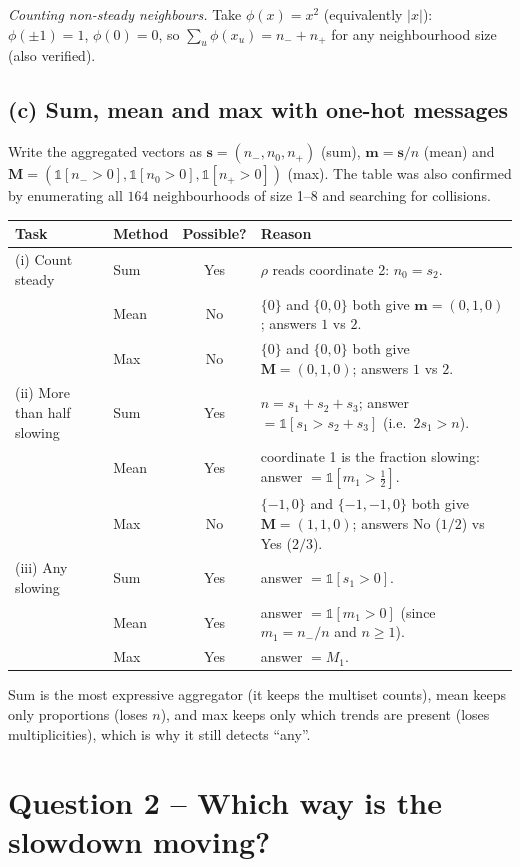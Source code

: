 \emph{Counting non-steady neighbours.} Take $\phi(x)=x^2$ (equivalently $|x|$): $\phi(\pm1)=1$, $\phi(0)=0$,
so $\sum_u\phi(x_u)=n_-+n_+$ for any neighbourhood size (also verified).

\subsection*{(c) Sum, mean and max with one-hot messages}
Write the aggregated vectors as $\mathbf s=(n_-,n_0,n_+)$ (sum), $\mathbf m=\mathbf s/n$ (mean) and
$\mathbf M=(\mathbb 1[n_->0],\mathbb 1[n_0>0],\mathbb 1[n_+>0])$ (max). The table was also confirmed by
enumerating all $164$ neighbourhoods of size 1--8 and searching for collisions.

\begin{center}
\small
\begin{tabular}{p{3.0cm}lcp{8.6cm}}
\toprule
Task & Method & Possible? & Reason \\
\midrule
(i) Count steady & Sum & Yes & $\rho$ reads coordinate 2: $n_0=s_2$. \\
 & Mean & No & $\{0\}$ and $\{0,0\}$ both give $\mathbf m=(0,1,0)$; answers $1$ vs $2$. \\
 & Max & No & $\{0\}$ and $\{0,0\}$ both give $\mathbf M=(0,1,0)$; answers $1$ vs $2$. \\
\midrule
(ii) More than half slowing & Sum & Yes & $n=s_1+s_2+s_3$; answer $=\mathbb 1[s_1>s_2+s_3]$ (i.e.\ $2s_1>n$). \\
 & Mean & Yes & coordinate 1 is the fraction slowing: answer $=\mathbb 1[m_1>\tfrac12]$. \\
 & Max & No & $\{-1,0\}$ and $\{-1,-1,0\}$ both give $\mathbf M=(1,1,0)$; answers No ($1/2$) vs Yes ($2/3$). \\
\midrule
(iii) Any slowing & Sum & Yes & answer $=\mathbb 1[s_1>0]$. \\
 & Mean & Yes & answer $=\mathbb 1[m_1>0]$ (since $m_1=n_-/n$ and $n\ge1$). \\
 & Max & Yes & answer $=M_1$. \\
\bottomrule
\end{tabular}
\end{center}
Sum is the most expressive aggregator (it keeps the multiset counts), mean keeps only proportions (loses $n$),
and max keeps only which trends are present (loses multiplicities), which is why it still detects ``any''.

\section{Question 2 -- Which way is the slowdown moving?}

